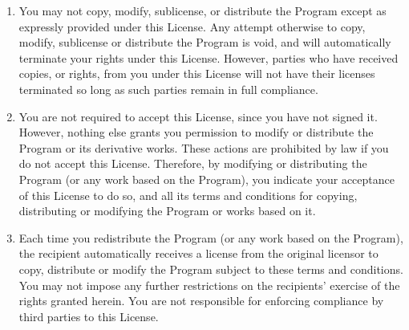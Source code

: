 \documentclass{book}
\begin{document}
{\begin{enumerate}
\begin{enumerate}
Accompany it with the information you received as to the offer
to distribute corresponding source code.  (This alternative is
allowed only for noncommercial distribution and only if you
received the program in object code or executable form with such
an offer, in accord with Subsection b above.)

\end{enumerate}


The source code for a work means the preferred form of the work for
making modifications to it.  For an executable work, complete source
code means all the source code for all modules it contains, plus any
associated interface definition files, plus the scripts used to
control compilation and installation of the executable.  However, as a
special exception, the source code distributed need not include
anything that is normally distributed (in either source or binary
form) with the major components (compiler, kernel, and so on) of the
operating system on which the executable runs, unless that component
itself accompanies the executable.

If distribution of executable or object code is made by offering
access to copy from a designated place, then offering equivalent
access to copy the source code from the same place counts as
distribution of the source code, even though third parties are not
compelled to copy the source along with the object code.

\item
You may not copy, modify, sublicense, or distribute the Program
except as expressly provided under this License.  Any attempt
otherwise to copy, modify, sublicense or distribute the Program is
void, and will automatically terminate your rights under this License.
However, parties who have received copies, or rights, from you under
this License will not have their licenses terminated so long as such
parties remain in full compliance.

\item
You are not required to accept this License, since you have not
signed it.  However, nothing else grants you permission to modify or
distribute the Program or its derivative works.  These actions are
prohibited by law if you do not accept this License.  Therefore, by
modifying or distributing the Program (or any work based on the
Program), you indicate your acceptance of this License to do so, and
all its terms and conditions for copying, distributing or modifying
the Program or works based on it.

\item
Each time you redistribute the Program (or any work based on the
Program), the recipient automatically receives a license from the
original licensor to copy, distribute or modify the Program subject to
these terms and conditions.  You may not impose any further
restrictions on the recipients' exercise of the rights granted herein.
You are not responsible for enforcing compliance by third parties to
this License.


\end{enumerate}}
\end{document}
